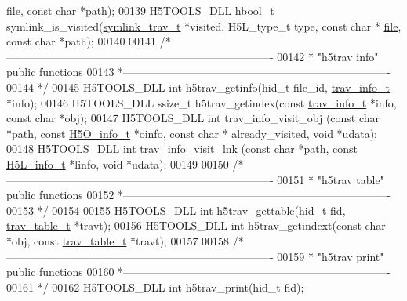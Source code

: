 \begin{DoxyCode}
      \hyperlink{structfile}{file}, \textcolor{keyword}{const} \textcolor{keywordtype}{char} *path);
00139 H5TOOLS\_DLL hbool\_t symlink\_is\_visited(\hyperlink{structsymlink__trav__t}{symlink\_trav\_t} *visited, H5L\_type\_t type, \textcolor{keyword}{const} \textcolor{keywordtype}{char} *
      \hyperlink{structfile}{file}, \textcolor{keyword}{const} \textcolor{keywordtype}{char} *path);
00140 
00141 \textcolor{comment}{/*-------------------------------------------------------------------------}
00142 \textcolor{comment}{ * "h5trav info" public functions}
00143 \textcolor{comment}{ *-------------------------------------------------------------------------}
00144 \textcolor{comment}{ */}
00145 H5TOOLS\_DLL \textcolor{keywordtype}{int} h5trav\_getinfo(hid\_t file\_id, \hyperlink{structtrav__info__t}{trav\_info\_t} *info);
00146 H5TOOLS\_DLL ssize\_t h5trav\_getindex(\textcolor{keyword}{const} \hyperlink{structtrav__info__t}{trav\_info\_t} *info, \textcolor{keyword}{const} \textcolor{keywordtype}{char} *obj);
00147 H5TOOLS\_DLL \textcolor{keywordtype}{int} trav\_info\_visit\_obj (\textcolor{keyword}{const} \textcolor{keywordtype}{char} *path, \textcolor{keyword}{const} \hyperlink{struct_h5_o__info__t}{H5O\_info\_t} *oinfo, \textcolor{keyword}{const} \textcolor{keywordtype}{char} *
      already\_visited, \textcolor{keywordtype}{void} *udata);
00148 H5TOOLS\_DLL \textcolor{keywordtype}{int} trav\_info\_visit\_lnk (\textcolor{keyword}{const} \textcolor{keywordtype}{char} *path, \textcolor{keyword}{const} \hyperlink{struct_h5_l__info__t}{H5L\_info\_t} *linfo, \textcolor{keywordtype}{void} *udata);
00149 
00150 \textcolor{comment}{/*-------------------------------------------------------------------------}
00151 \textcolor{comment}{ * "h5trav table" public functions}
00152 \textcolor{comment}{ *-------------------------------------------------------------------------}
00153 \textcolor{comment}{ */}
00154 
00155 H5TOOLS\_DLL \textcolor{keywordtype}{int}  h5trav\_gettable(hid\_t fid, \hyperlink{structtrav__table__t}{trav\_table\_t} *travt);
00156 H5TOOLS\_DLL \textcolor{keywordtype}{int}  h5trav\_getindext(\textcolor{keyword}{const} \textcolor{keywordtype}{char} *obj, \textcolor{keyword}{const} \hyperlink{structtrav__table__t}{trav\_table\_t} *travt);
00157 
00158 \textcolor{comment}{/*-------------------------------------------------------------------------}
00159 \textcolor{comment}{ * "h5trav print" public functions}
00160 \textcolor{comment}{ *-------------------------------------------------------------------------}
00161 \textcolor{comment}{ */}
00162 H5TOOLS\_DLL \textcolor{keywordtype}{int} h5trav\_print(hid\_t fid);

\end{DoxyCode}
